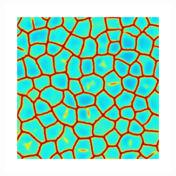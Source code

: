 \begin{frame}
\begin{columns}[T]
\begin{column}{0.6\textwidth}
\begin{figure}
\begin{subfigure}{0.32\linewidth}
        \end{subfigure}
        \begin{subfigure}{0.32\linewidth}
          \centering
          \includegraphics[width=0.8\textwidth]{Chapter345/figures/d_sqexp_cartesian_5_5_rho_0_seed_a}
        \end{subfigure}
        

\end{figure}
\end{column}
\end{columns}
\end{frame}
